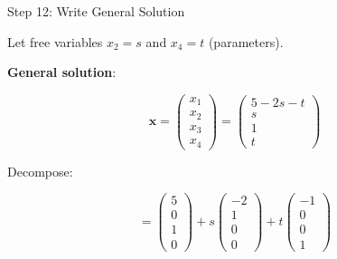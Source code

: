 \documentclass[10pt]{beamer}
\theoremstyle{definition}
\newcommand{\x}[1]{\alert{\textbf{#1}}}
\begin{document}
\begin{frame}{Step 12: Write General Solution}

Let free variables $x_2 = s$ and $x_4 = t$ (parameters).

\vspace{0.5em}

\x{General solution}:

$$\mathbf{x} = \begin{pmatrix} x_1 \\ x_2 \\ x_3 \\ x_4 \end{pmatrix} = \begin{pmatrix} 5 - 2s - t \\ s \\ 1 \\ t \end{pmatrix}$$

\vspace{1em}

Decompose:

$$= \begin{pmatrix} 5 \\ 0 \\ 1 \\ 0 \end{pmatrix} + s\begin{pmatrix} -2 \\ 1 \\ 0 \\ 0 \end{pmatrix} + t\begin{pmatrix} -1 \\ 0 \\ 0 \\ 1 \end{pmatrix}$$

\end{frame}
\end{document}
